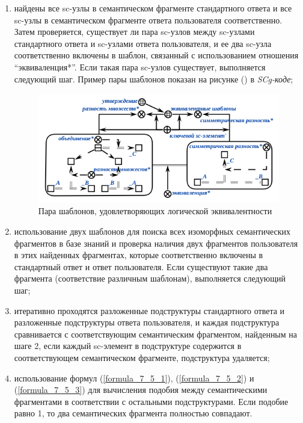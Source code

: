 \begin{enumerate}
	\item найдены все sc-узлы в семантическом фрагменте стандартного ответа и все sc-узлы в семантическом фрагменте ответа пользователя соответственно. Затем проверяется, существует ли пара sc-узлов между sc-узлами стандартного ответа и sc-узлами ответа пользователя, и ее два sc-узла соответственно включены в шаблон, связанный с использованием отношения ``эквиваленция*''. Если такая пара sc-узлов существует, выполняется следующий шаг. Пример пары шаблонов показан на рисунке (\textit{}) в \textit{SCg-коде};
	\begin{figure}[H]
		\includegraphics[scale=1]{author/part7/figures/equivalent_template_example.png}
		\caption{Пара шаблонов, удовлетворяющих логической эквивалентности}
		\label{fig:ET_example}
	\end{figure}
	
	\item использование двух шаблонов для поиска всех изоморфных семантических фрагментов в базе знаний и проверка наличия двух фрагментов пользователя в этих найденных фрагментах, которые соответственно включены в стандартный ответ и ответ пользователя. Если существуют такие два фрагмента (соответствие различным шаблонам), выполняется следующий шаг;
	
	\item итеративно проходятся разложенные подструктуры стандартного ответа и разложенные подструктуры ответа пользователя, и каждая подструктура сравнивается с соответствующим семантическим фрагментом, найденным на шаге 2, если каждый sc-элемент в подструктуре содержится в соответствующем семантическом фрагменте, подструктура удаляется;
	
	\item использование формул (\ref{formula_7_5_1}), (\ref{formula_7_5_2}) и (\ref{formula_7_5_3}) для вычисления подобия между семантическими фрагментами в соответствии с остальными подструктурами. Если подобие равно 1, то два семантических фрагмента полностью совпадают.
	
\end{enumerate}

